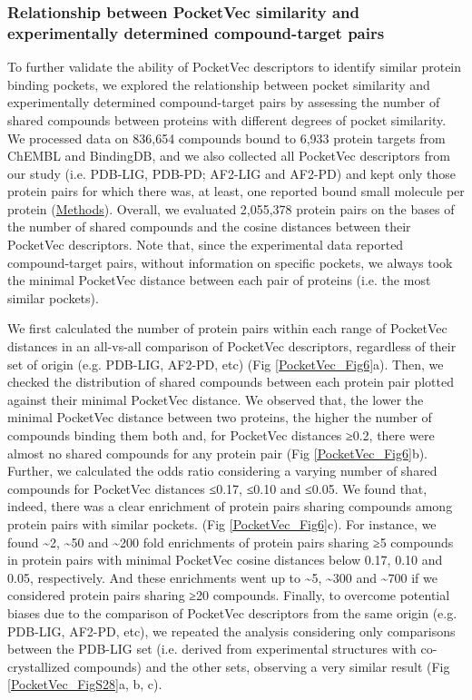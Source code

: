 \subsubsection{Relationship between PocketVec similarity and experimentally determined compound-target pairs}
\label{PocketVec_ResultsAndDiscussion_Relationship_PocketVecSimilarity_CPD-TARGET_pairs}

To further validate the ability of PocketVec descriptors to identify similar protein binding pockets, we explored the relationship between pocket similarity and experimentally determined compound-target pairs by assessing the number of shared compounds between proteins with different degrees of pocket similarity. We processed data on 836,654 compounds bound to 6,933 protein targets from ChEMBL\cite{zdrazil_chembl_2024} and BindingDB\cite{gilson_bindingdb_2016}, and we also collected all PocketVec descriptors from our study (i.e. PDB-LIG, PDB-PD; AF2-LIG and AF2-PD) and kept only those protein pairs for which there was, at least, one reported bound small molecule per protein (\hyperref[PocketVec_Methods]{Methods}). Overall, we evaluated 2,055,378 protein pairs on the bases of the number of shared compounds and the cosine distances between their PocketVec descriptors. Note that, since the experimental data reported compound-target pairs, without information on specific pockets, we always took the minimal PocketVec distance between each pair of proteins (i.e. the most similar pockets). 

We first calculated the number of protein pairs within each range of PocketVec distances in an all-vs-all comparison of PocketVec descriptors, regardless of their set of origin (e.g. PDB-LIG, AF2-PD, etc) (Fig \ref{PocketVec_Fig6}a). Then, we checked the distribution of shared compounds between each protein pair plotted against their minimal PocketVec distance. We observed that, the lower the minimal PocketVec distance between two proteins, the higher the number of compounds binding them both and, for PocketVec distances ≥0.2, there were almost no shared compounds for any protein pair (Fig \ref{PocketVec_Fig6}b). Further, we calculated the odds ratio considering a varying number of shared compounds for PocketVec distances ≤0.17, ≤0.10 and ≤0.05. We found that, indeed, there was a clear enrichment of protein pairs sharing compounds among protein pairs with similar pockets. (Fig \ref{PocketVec_Fig6}c). For instance, we found \textasciitilde2, \textasciitilde50 and \textasciitilde200 fold enrichments of protein pairs sharing ≥5 compounds in protein pairs with minimal PocketVec cosine distances below 0.17, 0.10 and 0.05, respectively. And these enrichments went up to \textasciitilde5, \textasciitilde300 and \textasciitilde700 if we considered protein pairs sharing ≥20 compounds. Finally, to overcome potential biases due to the comparison of PocketVec descriptors from the same origin (e.g. PDB-LIG, AF2-PD, etc), we repeated the analysis considering only comparisons between the PDB-LIG set (i.e. derived from experimental structures with co-crystallized compounds) and the other sets, observing a very similar result (Fig \ref{PocketVec_FigS28}a, b, c).

